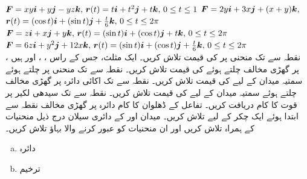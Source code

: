 \({{\boldsymbol{F}}}=xy{\boldsymbol{i}}+y{\boldsymbol{j}}-yz{\boldsymbol{k}},\, {{\boldsymbol{r}}}(t)=t{\boldsymbol{i}}+t^2{\boldsymbol{j}}+t{\boldsymbol{k}},\, 0\le t\le 1\)
\({{\boldsymbol{F}}}=2y{\boldsymbol{i}}+3x{\boldsymbol{j}}+(x+y){\boldsymbol{k}},\)\\
\( {{\boldsymbol{r}}}(t)=(\cos t){\boldsymbol{i}}+(\sin t){\boldsymbol{j}}+\tfrac{t}{6}{\boldsymbol{k}},\, 0\le t\le 2\pi\)
\({{\boldsymbol{F}}}=z{\boldsymbol{i}}+x{\boldsymbol{j}}+y{\boldsymbol{k}},\, {{\boldsymbol{r}}}(t)=(\sin t){\boldsymbol{i}}+(\cos t){\boldsymbol{j}}+t{\boldsymbol{k}},\, 0\le t\le 2\pi\)
\wf{\unexpanded{
\(-\pi\)}}
\({{\boldsymbol{F}}}=6z{\boldsymbol{i}}+y^2{\boldsymbol{j}}+12x{\boldsymbol{k}},\, {{\boldsymbol{r}}}(t)=(\sin t){\boldsymbol{i}}+(\cos t){\boldsymbol{j}}+\tfrac{t}{6}{\boldsymbol{k}},\, 0\le t\le 2\pi\)
\\
نقطہ  سے  تک منحنی  پر  کی قیمت تلاش کریں۔
ایک مثلث،  جس کے راس ،  ، اور  ہیں ، پر    گھڑی مخالف چلتے ہوئے   کی قیمت  تلاش کریں۔
نقطہ  سے  تک منحنی  پر چلتے ہوئے سمتیہ میدان  کے لیے  کی قیمت تلاش کریں۔ 
نقطہ  سے  تک اکائی دائرہ  پر گھڑی مخالف چلتے ہوئے سمتیہ میدان  کے لیے  کی قیمت  تلاش کریں۔ 
نقطہ  سے  تک سیدھی لکیر پر  قوت  کا  کام دریافت کریں۔ 
تفاعل  کے  ڈھلوان کا کام دائرہ  پر گھڑی مخالف نقطہ  سے ابتدا ہوئے ایک چکر کے لیے   تلاش کریں۔
میدان  اور  کے دائری سیلان درج ذیل منحنیات کے ہمراہ تلاش کریں اور ان منحنیات کو عبور کرنے والا  بہاؤ تلاش کریں۔ 
\begin{enumerate}[a.]
\item
دائرہ 
\item
ترخیم 
\end{enumerate}
